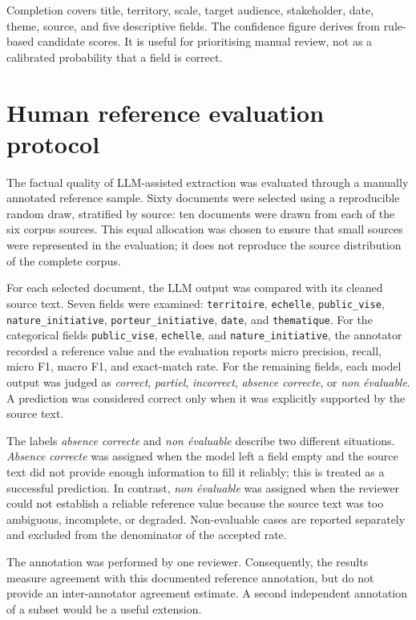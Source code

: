 \documentclass[
11pt,
english,
singlespacing,
headsepline,
]{MastersDoctoralThesis}
\begin{document}
Completion covers title, territory, scale, target audience, stakeholder, date,
theme, source, and five descriptive fields. The confidence figure derives from
rule-based candidate scores. It is useful for prioritising manual review, not as
a calibrated probability that a field is correct.

\section{Human reference evaluation protocol}

The factual quality of LLM-assisted extraction was evaluated through a manually
annotated reference sample. Sixty documents were selected using a reproducible
random draw, stratified by source: ten documents were drawn from each of the
six corpus sources. This equal allocation was chosen to ensure that small
sources were represented in the evaluation; it does not reproduce the source
distribution of the complete corpus.

For each selected document, the LLM output was compared with its cleaned source
text. Seven fields were examined: \texttt{territoire}, \texttt{echelle},
\texttt{public\_vise}, \texttt{nature\_initiative},
\texttt{porteur\_initiative}, \texttt{date}, and \texttt{thematique}.
For the categorical fields \texttt{public\_vise},
\texttt{echelle}, and \texttt{nature\_initiative}, the annotator recorded a
reference value and the evaluation reports micro precision, recall, micro F1,
macro F1, and exact-match rate. For the remaining fields, each model output was
judged as \textit{correct}, \textit{partiel}, \textit{incorrect},
\textit{absence correcte}, or \textit{non \'{e}valuable}. A prediction was
considered correct only when it was explicitly supported by the source text.

The labels \textit{absence correcte} and \textit{non \'{e}valuable} describe
two different situations. \textit{Absence correcte} was assigned when the model
left a field empty and the source text did not provide enough information to fill
it reliably; this is treated as a successful prediction. In contrast,
\textit{non \'{e}valuable} was assigned when the reviewer could not establish a
reliable reference value because the source text was too ambiguous, incomplete, or
degraded. Non-evaluable cases are reported separately and excluded from the
denominator of the accepted rate.

The annotation was performed by one reviewer. Consequently, the results
measure agreement with this documented reference annotation, but do not provide
an inter-annotator agreement estimate. A second independent annotation of a
subset would be a useful extension.
\end{document}
